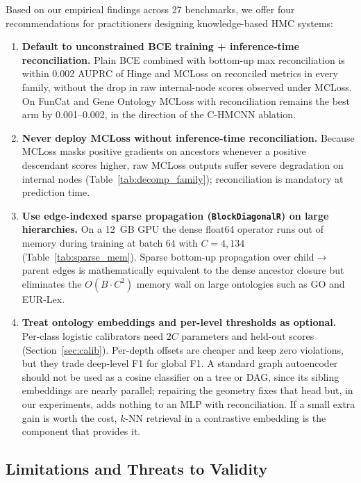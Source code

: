 \documentclass[preprint,12pt]{elsarticle}
\begin{document}
Based on our empirical findings across 27 benchmarks, we offer four
recommendations for practitioners designing knowledge-based HMC systems:
\begin{enumerate}[leftmargin=*,nosep]
  \item \textbf{Default to unconstrained BCE training + inference-time
    reconciliation.} Plain BCE combined with bottom-up max reconciliation
    is within 0.002 AUPRC of Hinge and MCLoss on reconciled metrics in every
    family, without the drop in raw internal-node scores observed under MCLoss.
    On FunCat and Gene Ontology MCLoss with reconciliation remains the best
    arm by 0.001--0.002, in the direction of the C-HMCNN ablation.
  \item \textbf{Never deploy MCLoss without inference-time reconciliation.}
    Because MCLoss masks positive gradients on ancestors whenever a positive
    descendant scores higher, raw MCLoss outputs suffer severe degradation on
    internal nodes (Table~\ref{tab:decomp_family}); reconciliation is mandatory
    at prediction time.
  \item \textbf{Use edge-indexed sparse propagation (\texttt{BlockDiagonalR})
    on large hierarchies.} On a 12~GB GPU the dense float64 operator runs out
    of memory during training at batch 64 with $C = 4{,}134$
    (Table~\ref{tab:sparse_mem}). Sparse bottom-up propagation over
    child$\rightarrow$parent edges is mathematically equivalent to the dense
    ancestor closure but eliminates the $O(B \cdot C^2)$ memory wall on large
    ontologies such as GO and EUR-Lex.
  \item \textbf{Treat ontology embeddings and per-level thresholds as
    optional.} Per-class logistic calibrators need $2C$ parameters and
    held-out scores (Section~\ref{sec:calib}). Per-depth offsets are cheaper and keep
    zero violations, but they trade deep-level F1 for global F1. A standard
    graph autoencoder should not be used as a cosine classifier on a tree or
    DAG, since its sibling embeddings are nearly parallel; repairing the
    geometry fixes that head but, in our experiments, adds nothing to an MLP
    with reconciliation. If a small extra gain is worth the cost, $k$-NN
    retrieval in a contrastive embedding is the component that provides it.
\end{enumerate}

\subsection{Limitations and Threats to Validity}
\end{document}
